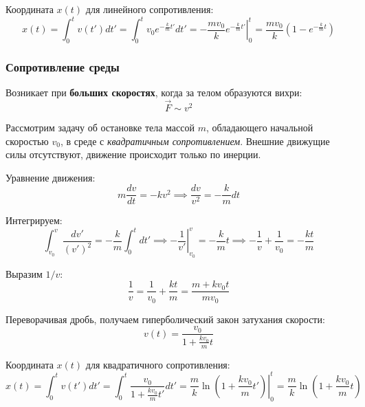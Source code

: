 Координата $x(t)$ для линейного сопротивления:
\[
x(t) = \int_0^t v(t') dt' = \int_0^t v_0 e^{-\frac{k}{m}t'} dt' 
= \left. -\frac{mv_0}{k} e^{-\frac{k}{m}t'} \right|_0^t 
= \frac{mv_0}{k} \left(1 - e^{-\frac{k}{m}t}\right)
\]

\subsubsection{Сопротивление среды}
Возникает при \textbf{больших скоростях}, когда за телом образуются вихри:
\[ \vec{F} \sim v^2 \]

Рассмотрим задачу об остановке тела массой $m$, обладающего начальной скоростью $v_0$, в среде с \textit{квадратичным сопротивлением}. Внешние движущие силы отсутствуют, движение происходит только по инерции.

Уравнение движения:
\[ m \frac{dv}{dt} = -kv^2\implies \frac{dv}{v^2} = -\frac{k}{m} dt \]

Интегрируем:
\[ \int_{v_0}^{v} \frac{dv'}{(v')^2} = -\frac{k}{m} \int_{0}^{t} dt'\implies \left. -\frac{1}{v'} \right|_{v_0}^{v} = -\frac{k}{m}t \implies -\frac{1}{v} + \frac{1}{v_0} = -\frac{kt}{m} \]

Выразим $1/v$:
\[ \frac{1}{v} = \frac{1}{v_0} + \frac{kt}{m} = \frac{m + kv_0 t}{mv_0} \]

Переворачивая дробь, получаем гиперболический закон затухания скорости:
\[
v(t) = \frac{v_0}{1 + \frac{kv_0}{m}t}
\]

Координата $x(t)$ для квадратичного сопротивления:
\[
x(t) = \int_0^t v(t') dt' = \int_0^t \frac{v_0}{1 + \frac{kv_0}{m}t'} dt'
= \left. \frac{m}{k} \ln\left(1 + \frac{kv_0}{m}t'\right) \right|_0^t
= \frac{m}{k} \ln\left(1 + \frac{kv_0}{m}t\right)
\]